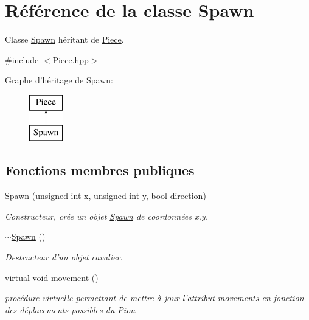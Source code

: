 \hypertarget{class_spawn}{\section{Référence de la classe Spawn}
\label{class_spawn}
}


Classe \hyperlink{class_spawn}{Spawn} héritant de \hyperlink{class_piece}{Piece}.  




{\ttfamily \#include $<$Piece.\-hpp$>$}

Graphe d'héritage de Spawn\-:\begin{figure}[H]
\begin{center}
\leavevmode
\includegraphics[height=2.000000cm]{class_spawn}
\end{center}
\end{figure}
\subsection*{Fonctions membres publiques}
\begin{DoxyCompactItemize}
\item 
\hyperlink{class_spawn_ad401aa751cbbf9ea4f444e3011ff36b5}{Spawn} (unsigned int x, unsigned int y, bool direction)
\begin{DoxyCompactList}\small\item\em Constructeur, crée un objet \hyperlink{class_spawn}{Spawn} de coordonnées x,y. \end{DoxyCompactList}\item 
\hyperlink{class_spawn_aea08036b23acdb06fd47eba35dc2a8cf}{$\sim$\-Spawn} ()
\begin{DoxyCompactList}\small\item\em Destructeur d'un objet cavalier. \end{DoxyCompactList}\item 
virtual void \hyperlink{class_spawn_ae176dffa40411480840c3e39cd619300}{movement} ()
\begin{DoxyCompactList}\small\item\em procédure virtuelle permettant de mettre à jour l'attribut movements en fonction des déplacements possibles du Pion \end{DoxyCompactList}\end{DoxyCompactItemize}
